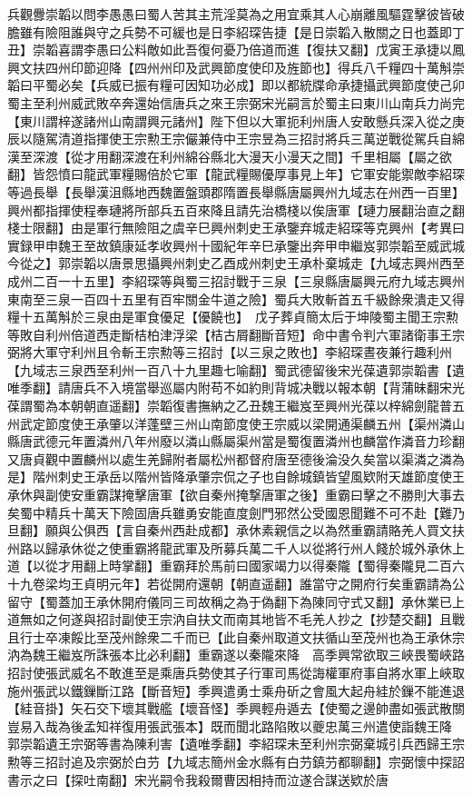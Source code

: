 兵觀釁崇韜以問李愚愚曰蜀人苦其主荒淫莫為之用宜乘其人心崩離風驅霆擊彼皆破膽雖有險阻誰與守之兵勢不可緩也是日李紹琛告捷【是日崇韜入散關之日也蓋即丁丑】崇韜喜謂李愚曰公料敵如此吾復何憂乃倍道而進【復扶又翻】戊寅王承捷以鳳興文扶四州印節迎降【四州州印及武興節度使印及旌節也】得兵八千糧四十萬斛崇韜曰平蜀必矣【兵威已振有糧可因知功必成】即以都統牒命承捷攝武興節度使己卯蜀主至利州威武敗卒奔還始信唐兵之來王宗弼宋光嗣言於蜀主曰東川山南兵力尚完【東川謂梓遂諸州山南謂興元諸州】陛下但以大軍扼利州唐人安敢懸兵深入從之庚辰以隨駕清道指揮使王宗勲王宗儼兼侍中王宗昱為三招討將兵三萬逆戰從駕兵自綿漢至深渡【從才用翻深渡在利州綿谷縣北大漫天小漫天之間】千里相屬【屬之欲翻】皆怨憤曰龍武軍糧賜倍於它軍【龍武糧賜優厚事見上年】它軍安能禦敵李紹琛等過長舉【長舉漢沮縣地西魏置盤頭郡隋置長舉縣唐屬興州九域志在州西一百里】興州都指揮使程奉璉將所部兵五百來降且請先治橋棧以俟唐軍【璉力展翻治直之翻棧士限翻】由是軍行無險阻之虞辛巳興州刺史王承鑒弃城走紹琛等克興州【考異曰實録甲申魏王至故鎮康延孝收興州十國紀年辛巳承鑒出奔甲申繼岌郭崇韜至威武城今從之】郭崇韜以唐景思攝興州刺史乙酉成州刺史王承朴棄城走【九域志興州西至成州二百一十五里】李紹琛等與蜀三招討戰于三泉【三泉縣唐屬興元府九域志興州東南至三泉一百四十五里有百牢關金牛道之險】蜀兵大敗斬首五千級餘衆潰走又得糧十五萬斛於三泉由是軍食優足【優饒也】　戊子葬貞簡太后于坤陵蜀主聞王宗勲等敗自利州倍道西走斷桔柏津浮梁【桔古屑翻斷音短】命中書令判六軍諸衛事王宗弼將大軍守利州且令斬王宗勲等三招討【以三泉之敗也】李紹琛晝夜兼行趣利州【九域志三泉西至利州一百八十九里趣七喻翻】蜀武德留後宋光葆遺郭崇韜書【遺唯季翻】請唐兵不入境當舉巡屬内附苟不如約則背城决戰以報本朝【背蒲昧翻宋光葆謂蜀為本朝朝直遥翻】崇韜復書撫納之乙丑魏王繼岌至興州光葆以梓綿劍龍普五州武定節度使王承肇以洋蓬壁三州山南節度使王宗威以梁開通渠麟五州【渠州潾山縣唐武德元年置潾州八年州廢以潾山縣屬渠州當是蜀復置潾州也麟當作潾音力珍翻又唐貞觀中置麟州以處生羌歸附者屬松州都督府唐至德後淪没久矣當以渠潾之潾為是】階州刺史王承岳以階州皆降承肇宗侃之子也自餘城鎮皆望風欵附天雄節度使王承休與副使安重霸謀掩擊唐軍【欲自秦州掩撃唐軍之後】重霸曰擊之不勝則大事去矣蜀中精兵十萬天下險固唐兵雖勇安能直度劍門邪然公受國恩聞難不可不赴【難乃旦翻】願與公俱西【言自秦州西赴成都】承休素親信之以為然重霸請賂羌人買文扶州路以歸承休從之使重霸將龍武軍及所募兵萬二千人以從將行州人餞於城外承休上道【以從才用翻上時掌翻】重霸拜於馬前曰國家竭力以得秦隴【蜀得秦隴見二百六十九卷梁均王貞明元年】若從開府還朝【朝直遥翻】誰當守之開府行矣重霸請為公留守【蜀蓋加王承休開府儀同三司故稱之為于偽翻下為陳同守式又翻】承休業已上道無如之何遂與招討副使王宗汭自扶文而南其地皆不毛羌人抄之【抄楚交翻】且戰且行士卒凍餒比至茂州餘衆二千而已【此自秦州取道文扶循山至茂州也為王承休宗汭為魏王繼岌所誅張本比必利翻】重霸遂以秦隴來降　高季興常欲取三峽畏蜀峽路招討使張武威名不敢進至是乘唐兵勢使其子行軍司馬從誨權軍府事自將水軍上峽取施州張武以鐵鏁斷江路【斷音短】季興遣勇士乘舟斫之會風大起舟絓於鏁不能進退【絓音掛】矢石交下壞其戰艦【壞音怪】季興輕舟遁去【使蜀之邊帥盡如張武散關豈易入哉為後孟知祥復用張武張本】既而聞北路陷敗以夔忠萬三州遣使詣魏王降　郭崇韜遺王宗弼等書為陳利害【遺唯季翻】李紹琛未至利州宗弼棄城引兵西歸王宗勲等三招討追及宗弼於白芀【九域志簡州金水縣有白芀鎮芀都聊翻】宗弼懷中探詔書示之曰【探吐南翻】宋光嗣令我殺爾曹因相持而泣遂合謀送欵於唐

